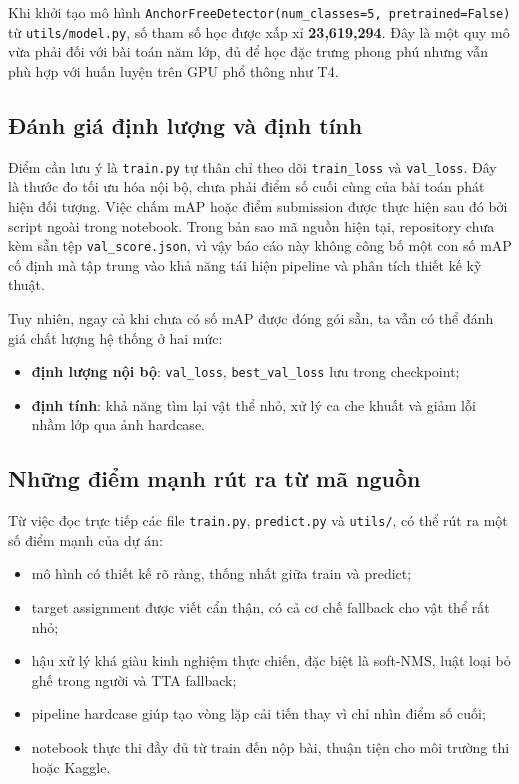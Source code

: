 \documentclass[12pt,a4paper]{article}
\begin{document}
Khi khởi tạo mô hình \texttt{AnchorFreeDetector(num\_classes=5, pretrained=False)} từ \texttt{utils/model.py}, số tham số học được xấp xỉ \textbf{23{,}619{,}294}. Đây là một quy mô vừa phải đối với bài toán năm lớp, đủ để học đặc trưng phong phú nhưng vẫn phù hợp với huấn luyện trên GPU phổ thông như T4.

\subsection{Đánh giá định lượng và định tính}
Điểm cần lưu ý là \texttt{train.py} tự thân chỉ theo dõi \texttt{train\_loss} và \texttt{val\_loss}. Đây là thước đo tối ưu hóa nội bộ, chưa phải điểm số cuối cùng của bài toán phát hiện đối tượng. Việc chấm mAP hoặc điểm submission được thực hiện sau đó bởi script ngoài trong notebook. Trong bản sao mã nguồn hiện tại, repository chưa kèm sẵn tệp \texttt{val\_score.json}, vì vậy báo cáo này không công bố một con số mAP cố định mà tập trung vào khả năng tái hiện pipeline và phân tích thiết kế kỹ thuật.

Tuy nhiên, ngay cả khi chưa có số mAP được đóng gói sẵn, ta vẫn có thể đánh giá chất lượng hệ thống ở hai mức:
\begin{itemize}
    \item \textbf{định lượng nội bộ}: \texttt{val\_loss}, \texttt{best\_val\_loss} lưu trong checkpoint;
    \item \textbf{định tính}: khả năng tìm lại vật thể nhỏ, xử lý ca che khuất và giảm lỗi nhầm lớp qua ảnh hardcase.
\end{itemize}

\subsection{Những điểm mạnh rút ra từ mã nguồn}
Từ việc đọc trực tiếp các file \texttt{train.py}, \texttt{predict.py} và \texttt{utils/}, có thể rút ra một số điểm mạnh của dự án:
\begin{itemize}
    \item mô hình có thiết kế rõ ràng, thống nhất giữa train và predict;
    \item target assignment được viết cẩn thận, có cả cơ chế fallback cho vật thể rất nhỏ;
    \item hậu xử lý khá giàu kinh nghiệm thực chiến, đặc biệt là soft-NMS, luật loại bỏ ghế trong người và TTA fallback;
    \item pipeline hardcase giúp tạo vòng lặp cải tiến thay vì chỉ nhìn điểm số cuối;
    \item notebook thực thi đầy đủ từ train đến nộp bài, thuận tiện cho môi trường thi hoặc Kaggle.
\end{itemize}
\end{document}
